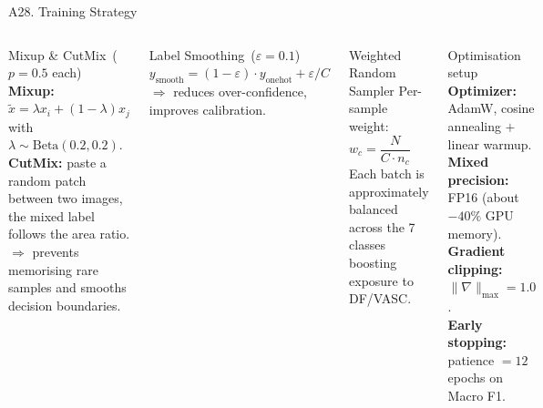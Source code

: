 \documentclass[10pt, aspectratio=169]{beamer}
\begin{document}
\begin{frame}{A28. Training Strategy}
    \begin{columns}[T]
        \begin{block}{Mixup \& CutMix\ \footnotesize($p = 0.5$ each)}
            \scriptsize
            \textbf{Mixup:} $\tilde{x} = \lambda x_i + (1-\lambda) x_j$ with $\lambda \sim \mathrm{Beta}(0.2, 0.2)$.\\[2pt]
            \textbf{CutMix:} paste a random patch between two images, the mixed label follows the area ratio.\\[3pt]
            $\Rightarrow$ prevents memorising rare samples and smooths decision boundaries.
        \end{block}

        \begin{block}{Label Smoothing\ \footnotesize($\varepsilon = 0.1$)}
            \scriptsize
            $y_{\text{smooth}} = (1-\varepsilon) \cdot y_{\text{onehot}} + \varepsilon / C$\\[2pt]
            $\Rightarrow$ reduces over-confidence, improves calibration.
        \end{block}

        \begin{block}{Weighted Random Sampler}
            \scriptsize
            Per-sample weight: $w_c = \dfrac{N}{C \cdot n_c}$\\[2pt]
            Each batch is approximately balanced across the 7 classes \textemdash{} boosting exposure to DF/VASC.
        \end{block}

        \begin{block}{Optimisation setup}
            \scriptsize
            \textbf{Optimizer:} AdamW, cosine annealing $+$ linear warmup.\\
            \textbf{Mixed precision:} FP16 (about $-40\%$ GPU memory).\\
            \textbf{Gradient clipping:} $\|\nabla\|_{\max} = 1.0$.\\
            \textbf{Early stopping:} patience $= 12$ epochs on Macro F1.
        \end{block}
    \end{columns}
\end{frame}
\end{document}
